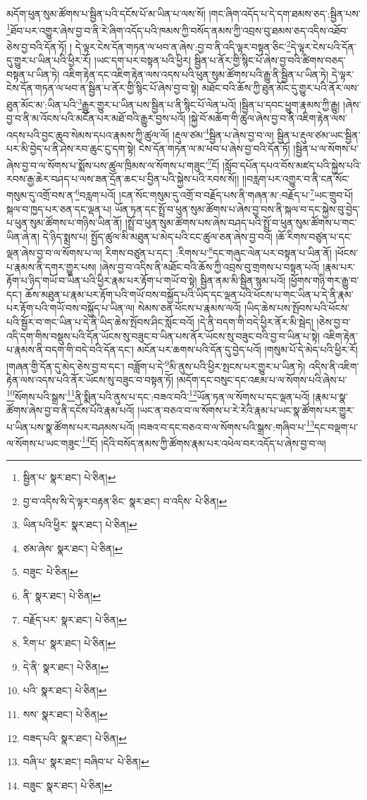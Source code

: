 མདོག་ཕུན་སུམ་ཚོགས་པ་སྦྱིན་པའི་དངོས་པོ་མ་ཡིན་པ་ལས་སོ། །གང་ཞིག་འདོད་པ་དེ་དག་ཐམས་ཅད་:སྦྱིན་པས་\footnote{སྦྱིན་པ་  སྣར་ཐང་།  པེ་ཅིན། }ཐོབ་པར་འགྱུར་ཞེས་བྱ་བ་ནི་རེ་ཞིག་འདོད་པའི་ཁམས་ཀྱི་བསོད་ནམས་ཀྱི་འབྲས་བུ་ཐམས་ཅད་འདིས་འཐོབ་ཅེས་བྱ་བའི་དོན་ཏོ། །
དེ་ལྟར་ངེས་དོན་གཏན་ལ་ཕབ་ན་ཞེས་:བྱ་བ་ནི་འདི་ལྟར་བསྟན་ཅིང་\footnote{བྱ་བ་འདིས་ིས་དེ་ལྟར་བརྟན་ཅིང་  སྣར་ཐང་། བ་འདིས་  པེ་ཅིན། }དེ་ལྟར་ངེས་པའི་དོན་དུ་གྱུར་པ་ཡིན་པའི་ཕྱིར་རོ། །ཡང་དག་པར་བསྟན་པའི་ཕྱིར། སྦྱིན་པ་ནོར་གྱི་སྙིང་པོ་ཞེས་བྱ་བའི་ཚིགས་བཅད་བསྟན་པ་ཡིན་ཏེ། འཇིག་རྟེན་དང་འཇིག་རྟེན་ལས་འདས་པའི་ཕུན་སུམ་ཚོགས་པའི་རྒྱུ་ནི་སྦྱིན་པ་ཡིན་ཏེ། དེ་ལྟར་ངེས་དོན་གཏན་ལ་ཕབ་ན་སྦྱིན་པ་ནོར་གྱི་སྙིང་པོ་ཞེས་བྱ་བ་སྟེ། མཐོང་བའི་ཆོས་ཀྱི་ཐུན་མོང་དུ་གྱུར་པའི་ནོར་ལས་ཐུན་མོང་མ་:ཡིན་པའི་\footnote{ཡིན་པའི་ཕྱིར་  སྣར་ཐང་།  པེ་ཅིན། }རྒྱུར་གྱུར་པ་ཡིན་པས་སྦྱིན་པ་ནི་སྙིང་པོ་ལེན་པའོ། །སྦྱིན་པ་དབང་ཕྱུག་རྣམས་ཀྱི་རྒྱུ། །ཞེས་བྱ་བ་ནི་མ་འོངས་པའི་མངོན་པར་མཐོ་བའི་རྒྱུར་བྱས་པའོ། །སྐྱེ་བོ་མཆོག་གི་ཚུལ་ཞེས་བྱ་བ་ནི་འཇིག་རྟེན་ལས་འདས་པའི་བྱང་ཆུབ་སེམས་དཔའ་རྣམས་ཀྱི་ཚུལ་ལོ། །རྡུལ་ཙམ་\footnote{ཙམ་ཞེས་  སྣར་ཐང་།  པེ་ཅིན། }སྦྱིན་པ་ཞེས་བྱ་བ་ལ། སྦྱིན་པ་རྡུལ་ཙམ་ཡང་སྦྱིན་པར་མི་བྱེད་པ་ནི་ཤེས་རབ་ཆུང་ངུ་དག་སྟེ། ངེས་དོན་གཏན་ལ་མ་ཕབ་པ་ཞེས་བྱ་བའི་དོན་ཏོ། །སྦྱིན་པ་ལ་སོགས་པ་ཞེས་བྱ་བ་ལ་སོགས་པ་སྨོས་པས་ཚུལ་ཁྲིམས་ལ་སོགས་པ་གཟུང་\footnote{བཟུང་  པེ་ཅིན། }ངོ། །སློབ་དཔོན་དཔའ་བོས་མཛད་པའི་སྐྱེས་པའི་རབས་རྒྱ་ཆེར་བཤད་པ་ལས་ཟན་དྲོན་ཆང་པ་བྱིན་པའི་སྐྱེས་པའི་རབས་སོ།། །།བརླག་པར་འགྱུར་བ་ནི་ངན་སོང་གསུམ་དུ་འགྲོ་བས་ན་\footnote{ནི་  སྣར་ཐང་།  པེ་ཅིན། }བརླག་པའོ། །ངན་སོང་གསུམ་དུ་འགྲོ་བ་བརྗོད་པས་ནི་གཞན་མ་:བརྗོད་པ་\footnote{བརྗོད་པར་  སྣར་ཐང་།  པེ་ཅིན། }ཡང་གྲུབ་པོ། སྐལ་བ་ཁྱད་པར་ཅན་དང་ལྡན་པ། ཡོན་ཏན་དང་སྤྲོ་བ་ཕུན་སུམ་ཚོགས་པ་ཞེས་བྱ་བས་ནི་སྐལ་བ་དང་སྐྱེས་བུ་བྱེད་པ་ཕུན་སུམ་ཚོགས་པ་གཉིས་ཡིན་ནོ། །སྤྲོ་བ་ཕུན་སུམ་ཚོགས་པས་ཞེས་བཤད་པའི་སྤྲོ་བ་ཕུན་སུམ་ཚོགས་པ་གང་ཡིན་ཞེ་ན། དེ་ཉིད་སྨྲས་པ། སྤྱོད་ཚུལ་མི་མཐུན་པ་མེད་པའི་ངང་ཚུལ་ཅན་ཞེས་བྱ་བའོ། །ཆོ་རིགས་བཙུན་པ་དང་ལྡན་ཞེས་བྱ་བ་ལ་སོགས་པ་ལ། རིགས་བཙུན་པ་དང་། :རིགས་པ་\footnote{རིག་པ་  སྣར་ཐང་།  པེ་ཅིན། }དང་གཞུང་ལེན་པར་བསྟན་པ་ཡིན་ནོ། །ཕོངས་པ་རྣམས་ནི་དགར་གྱུར་པས། །ཞེས་བྱ་བ་འདིས་ནི་མཐོང་བའི་ཆོས་ཀྱི་འབྲས་བུ་གྲགས་པ་བསྟན་པའོ། །རྣམ་པར་རྟོག་པ་ཉིད་གཡོ་བ་ཡིན་པའི་ཕྱིར་རྣམ་པར་རྟོག་པ་གཡོ་བ་སྟེ། སྦྱིན་ནམ་མི་སྦྱིན་སྙམ་པའོ། །ཕྱོགས་གཉི་གར་རྒྱུ་བ་དང་། ཆོས་མཐུན་པ་རྣམ་པར་རྟོག་པའི་གཡོ་བས་བསྐྱོད་པའི་ཡིད་དང་ལྡན་པའི་ཕོངས་པ་གང་ཡིན་པ་དེ་ནི་རྣམ་པར་རྟོག་པའི་གཡོ་བས་བསྐྱོད་པ་ཡིན་ལ། སེམས་ཅན་ཕོངས་པ་རྣམས་ལའོ། །ཡིད་ཆེས་པས་སྤོབས་པའི་ཕོངས་པའི་སྦྱོར་བ་གང་ཡིན་པ་དེ་ནི་ཡིད་ཆེས་སྤོབས་ཤིང་སློང་བའོ། །དེ་ནི་བདག་གི་བདེ་ཕྱིར་ནོར་མི་སྦེད། །ཅེས་བྱ་བ་འདི་དག་གིས་བསྡུས་པའི་དོན་ཡོངས་སུ་བཟུང་བ་ཡིན་པས་ནོར་ཡོངས་སུ་བཟུང་བའི་བྱ་བ་ཡིན་པ་སྟེ། འཇིག་རྟེན་པ་རྣམས་ནི་བདག་གི་བདེ་བའི་དོན་དང་། མངོན་པར་ཆགས་པའི་དོན་དུ་བྱེད་པའོ། །གསུམ་པོ་དེ་མེད་པའི་ཕྱིར་རོ། །གཞན་གྱི་དོན་དུ་མེད་ཅེས་བྱ་བ་དང་། བཟློག་པ་དེ་\footnote{དེ་ནི་  སྣར་ཐང་།  པེ་ཅིན། }མི་ནུས་པའི་ཕྱིར་སྤངས་པར་གྱུར་པ་ཡིན་ཏེ། འདིས་ནི་འཇིག་རྟེན་ལས་འདས་པའི་ནོར་ཡོངས་སུ་བཟུང་བ་བསྟན་ཏོ། །མདོག་དང་བསུང་དང་འཇམ་པ་ལ་སོགས་པའི་ཞེས་པ་\footnote{པའི་  སྣར་ཐང་།  པེ་ཅིན། }སོགས་པའི་སྒྲས་\footnote{སས་  སྣར་ཐང་།  པེ་ཅིན། }ནི་སྨིན་པའི་ནུས་པ་དང་:བཟའ་བའི་\footnote{བཟད་པའི་  སྣར་ཐང་།  པེ་ཅིན། }ཡོན་ཏན་ལ་སོགས་པ་དང་ལྡན་པའོ། །རྣམ་པ་སྣ་ཚོགས་ཞེས་བྱ་བ་ནི་དངོས་པོའི་རྣམ་པའོ། །ཡང་ན་བཅའ་བ་ལ་སོགས་པ་རེ་རེའི་རྣམ་པ་ཡང་སྣ་ཚོགས་པར་གྱུར་པ་ཡིན་པས་སྣ་ཚོགས་པར་བཤམས་པའོ། །བཟའ་བ་དང་བཅའ་བ་ལ་སོགས་པའི་སྒྲས་:གཞིབ་པ་\footnote{བཞི་པ་  སྣར་ཐང་། བཞིབ་པ་  པེ་ཅིན། }དང་བལྡག་པ་ལ་སོགས་པ་ཡང་གཟུང་\footnote{བཟུང་  སྣར་ཐང་།  པེ་ཅིན། }ངོ། །དེའི་བསོད་ནམས་ཀྱི་ཚོགས་རྣམ་པར་འཕེལ་བར་འདོད་པ་ཞེས་བྱ་བ་ལ། 